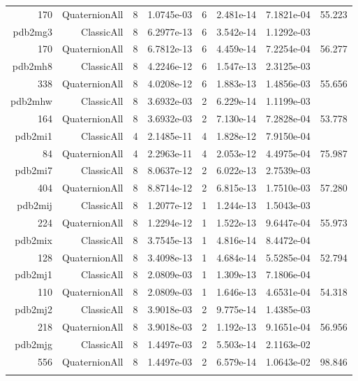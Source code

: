 \begin{xltabular}{\textwidth}{r|rcS[table-format=1.4e+2]cS[table-format=1.3e+2]S[table-format=1.4e+2]S[table-format=-1.3]}
170 & QuaternionAll & 8 & 1.0745e-03 & 6 & 2.481e-14 & 7.1821e-04 & 55.223\\  \addlinespace
pdb2mg3 & ClassicAll & 8 & 6.2977e-13 & 6 & 3.542e-14 & 1.1292e-03 & \\
170 & QuaternionAll & 8 & 6.7812e-13 & 6 & 4.459e-14 & 7.2254e-04 & 56.277\\  \addlinespace
pdb2mh8 & ClassicAll & 8 & 4.2246e-12 & 6 & 1.547e-13 & 2.3125e-03 & \\
338 & QuaternionAll & 8 & 4.0208e-12 & 6 & 1.883e-13 & 1.4856e-03 & 55.656\\  \addlinespace
pdb2mhw & ClassicAll & 8 & 3.6932e-03 & 2 & 6.229e-14 & 1.1199e-03 & \\
164 & QuaternionAll & 8 & 3.6932e-03 & 2 & 7.130e-14 & 7.2828e-04 & 53.778\\  \addlinespace
pdb2mi1 & ClassicAll & 4 & 2.1485e-11 & 4 & 1.828e-12 & 7.9150e-04 & \\
84 & QuaternionAll & 4 & 2.2963e-11 & 4 & 2.053e-12 & 4.4975e-04 & 75.987\\  \addlinespace
pdb2mi7 & ClassicAll & 8 & 8.0637e-12 & 2 & 6.022e-13 & 2.7539e-03 & \\
404 & QuaternionAll & 8 & 8.8714e-12 & 2 & 6.815e-13 & 1.7510e-03 & 57.280\\  \addlinespace
pdb2mij & ClassicAll & 8 & 1.2077e-12 & 1 & 1.244e-13 & 1.5043e-03 & \\
224 & QuaternionAll & 8 & 1.2294e-12 & 1 & 1.522e-13 & 9.6447e-04 & 55.973\\  \addlinespace
pdb2mix & ClassicAll & 8 & 3.7545e-13 & 1 & 4.816e-14 & 8.4472e-04 & \\
128 & QuaternionAll & 8 & 3.4098e-13 & 1 & 4.684e-14 & 5.5285e-04 & 52.794\\  \addlinespace
pdb2mj1 & ClassicAll & 8 & 2.0809e-03 & 1 & 1.309e-13 & 7.1806e-04 & \\
110 & QuaternionAll & 8 & 2.0809e-03 & 1 & 1.646e-13 & 4.6531e-04 & 54.318\\  \addlinespace
pdb2mj2 & ClassicAll & 8 & 3.9018e-03 & 2 & 9.775e-14 & 1.4385e-03 & \\
218 & QuaternionAll & 8 & 3.9018e-03 & 2 & 1.192e-13 & 9.1651e-04 & 56.956\\  \addlinespace
pdb2mjg & ClassicAll & 8 & 1.4497e-03 & 2 & 5.503e-14 & 2.1163e-02 & \\
556 & QuaternionAll & 8 & 1.4497e-03 & 2 & 6.579e-14 & 1.0643e-02 & 98.846\\  \addlinespace

\end{xltabular}
